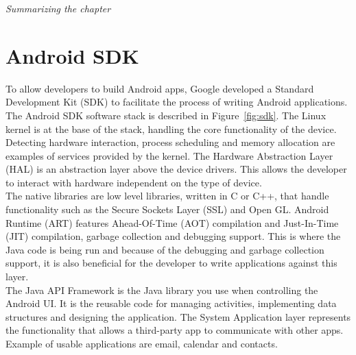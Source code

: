\textit{Summarizing the chapter}

\section{Android SDK}
To allow developers to build Android apps, Google developed a Standard Development Kit (SDK) to facilitate the process of writing Android applications. The Android SDK software stack is described in Figure~\ref{fig:sdk}. The Linux kernel is at the base of the stack, handling the core functionality of the device. Detecting hardware interaction, process scheduling and memory allocation are examples of services provided by the kernel. The Hardware Abstraction Layer (HAL) is an abstraction layer above the device drivers. This allows the developer to interact with hardware independent on the type of device\cite{android:hal}.\\

The native libraries are low level libraries, written in C or C++, that handle functionality such as the Secure Sockets Layer (SSL) and Open GL\cite{komatineni2012pro}. Android Runtime (ART) features Ahead-Of-Time (AOT) compilation and Just-In-Time (JIT) compilation, garbage collection and debugging support\cite{android:sdk:stack}. This is where the Java code is being run and because of the debugging and garbage collection support, it is also beneficial for the developer to write applications against this layer.\\

The Java API Framework is the Java library you use when controlling the Android UI. It is the reusable code for managing activities, implementing data structures and designing the application. The System Application layer represents the functionality that allows a third-party app to communicate with other apps. Example of usable applications are email, calendar and contacts\cite{android:sdk:stack}.

